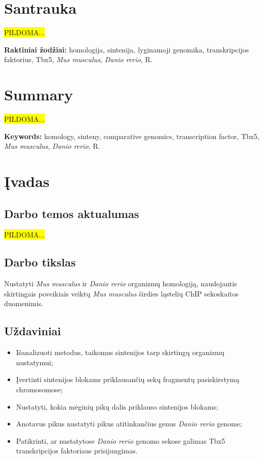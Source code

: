 \documentclass[12pt]{article}
\begin{document}
\section*{Santrauka}

\colorbox{yellow}{PILDOMA...}

\hfill \break
\textbf{Raktiniai žodžiai:} homologija, sintenija, lyginamoji genomika,
    transkripcijos faktorius, Tbx5, \emph{Mus musculus}, \emph{Danio rerio}, R.

\newpage


\section*{Summary}

\colorbox{yellow}{PILDOMA...}

\hfill \break
\textbf{Keywords:} homology, sinteny, comparative genomics,
    transcription factor, Tbx5, \emph{Mus musculus}, \emph{Danio rerio}, R.

\newpage


\section{Įvadas}
\subsection*{Darbo temos aktualumas}
\colorbox{yellow}{PILDOMA...}

\subsection*{Darbo tikslas}

Nustatyti \emph{Mus musculus} ir \emph{Danio rerio} organizmų homologiją,
naudojantis skirtingais poveikiais veiktų \emph{Mus musculus} širdies
ląstelių ChIP sekoskaitos duomenimis.

\subsection*{Uždaviniai}
\begin{itemize}
    \item Išanalizuoti metodus, taikomus sintenijos tarp skirtingų organizmų
    nustatymui;
    \item Įvertinti sintenijos blokams priklausančių sekų fragmentų
    pasiskirstymą chromosomose;
    \item Nustatyti, kokia mėginių pikų dalis priklauso sintenijos blokams;
    \item Anotavus pikus nustatyti pikus atitinkančius genus \emph{Danio rerio}
    genome;
    \item Patikrinti, ar nustatytose \emph{Danio rerio} genomo sekose galimas
    Tbx5 transkripcijos faktoriaus prisijungimas.
\end{itemize}
\end{document}
